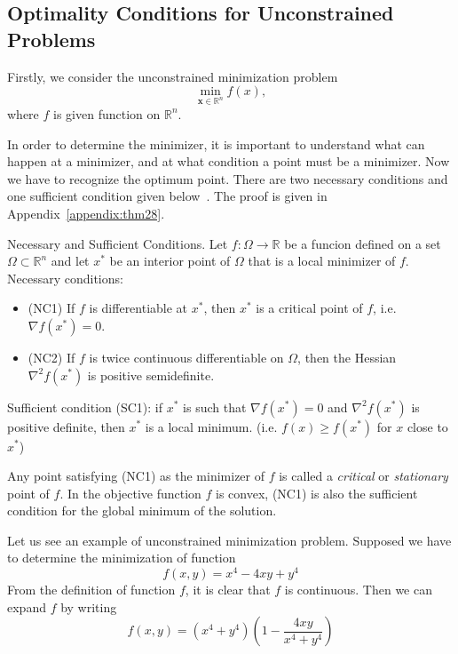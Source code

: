 \subsection{Optimality Conditions for Unconstrained Problems}
Firstly, we consider the unconstrained minimization problem
\begin{equation}
    \min _{\mathbf{x} \in \mathbb{R}^{n}} f(x),
\end{equation}
where $f$ is given function on $\mathbb{R}^n$. 
\par In order to determine the minimizer, it is important to understand what can happen at a minimizer, and at what condition a point must be a minimizer. Now we have to recognize the optimum point. There are two necessary conditions and one sufficient condition given below~\citep{JS:06}. The proof is given in Appendix~\ref{appendix:thm28}.
\begin{thm}{Necessary and Sufficient Conditions.}
    \label{thm28}
    Let $f:\Omega \rightarrow \mathbb{R}$ be a funcion defined on a set $\Omega \subset \mathbb{R}^n$ and let $x^*$ be an interior point of $\Omega$ that is a local minimizer of $f$. \\
    Necessary conditions:
    \begin{itemize}
        \item (NC1) If $f$ is differentiable at $x^*$, then $x^*$ is a critical point of $f$, i.e. $\nabla f\left(x^{*}\right)=0$.
        \item (NC2) If $f$ is twice continuous differentiable on $\Omega$, then the Hessian $\nabla^2 f\left(x^{*}\right)$ is positive semidefinite.
    \end{itemize}
    Sufficient condition (SC1): if $x^*$ is such that $\nabla f\left(x^{*}\right)=0$ and $\nabla^2 f\left(x^{*}\right)$ is positive definite, then $x^*$ is a local minimum. (i.e. $f(x) \geq f(x^*)$ for $x$ close to $x^*$)
\end{thm}
\par Any point satisfying (NC1) as the minimizer of $f$ is called a \emph{critical} or \emph{stationary} point of $f$. In the objective function $f$ is convex, (NC1) is also the sufficient condition for the global minimum of the solution. 
\par Let us see an example of unconstrained minimization problem. Supposed we have to determine the minimization of function
$$
f(x, y)=x^{4}-4 x y+y^{4}
$$
From the definition of function $f$, it is clear that $f$ is continuous. Then we can expand $f$ by writing
$$
f(x, y)=\left(x^{4}+y^{4}\right)\left(1-\frac{4 x y}{x^{4}+y^{4}}\right)
$$
